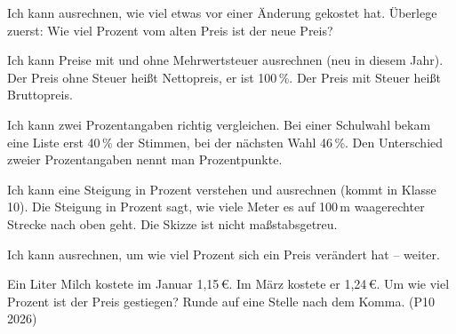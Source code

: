 \begin{aufgabe}{Ich kann ausrechnen, wie viel etwas vor einer Änderung gekostet hat. Überlege zuerst: Wie viel Prozent vom alten Preis ist der neue Preis?}
\end{aufgabe}

\begin{aufgabe}{Ich kann Preise mit und ohne Mehrwertsteuer ausrechnen (neu in diesem Jahr). Der Preis ohne Steuer heißt Nettopreis, er ist 100\,\%. Der Preis mit Steuer heißt Bruttopreis.}
\end{aufgabe}

\begin{aufgabe}{Ich kann zwei Prozentangaben richtig vergleichen. Bei einer Schulwahl bekam eine Liste erst 40\,\% der Stimmen, bei der nächsten Wahl 46\,\%. Den Unterschied zweier Prozentangaben nennt man Prozentpunkte.}
\end{aufgabe}

\begin{aufgabe}{Ich kann eine Steigung in Prozent verstehen und ausrechnen (kommt in Klasse 10). Die Steigung in Prozent sagt, wie viele Meter es auf 100\,m waagerechter Strecke nach oben geht. Die Skizze ist nicht maßstabsgetreu.}
\end{aufgabe}

\begin{aufgabe}{Ich kann ausrechnen, um wie viel Prozent sich ein Preis verändert hat – weiter.}
\begin{teile}
\teil Ein Liter Milch kostete im Januar 1,15\,€. Im März kostete er 1,24\,€. Um wie viel Prozent ist der Preis gestiegen? Runde auf eine Stelle nach dem Komma. (P10 2026)
\end{teile}
\end{aufgabe}

